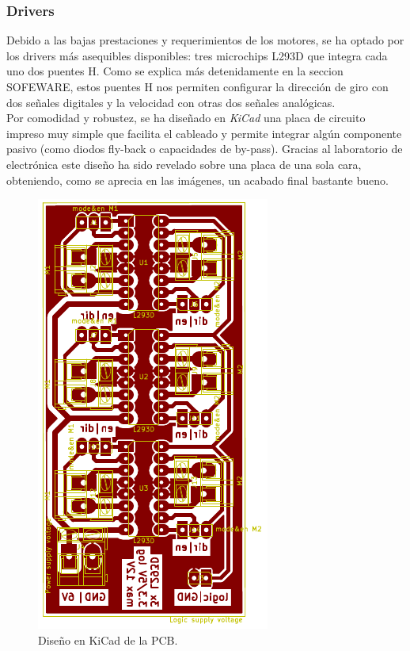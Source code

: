 \subsubsection{Drivers}
Debido a las bajas prestaciones y requerimientos de los motores, se ha optado por los drivers más asequibles disponibles: tres microchips L293D que integra cada uno dos puentes H. Como se explica más detenidamente en la seccion SOFEWARE, estos puentes H nos permiten configurar la dirección de giro con dos señales digitales y la velocidad con otras dos señales analógicas.\\
Por comodidad y robustez, se ha diseñado en \textit{KiCad} una placa de circuito impreso muy simple que facilita el cableado y permite integrar algún componente pasivo (como diodos fly-back o capacidades de by-pass). Gracias al laboratorio de electrónica este diseño ha sido revelado sobre una placa de una sola cara, obteniendo, como se aprecia en las imágenes, un acabado final bastante bueno.\\
 \begin{figure}[h!]
 	\centering
 	\includegraphics[width=.6\textwidth]{images/hw/pcb_kicad}
 	\caption{Diseño en KiCad de la PCB.}
 \end{figure}
